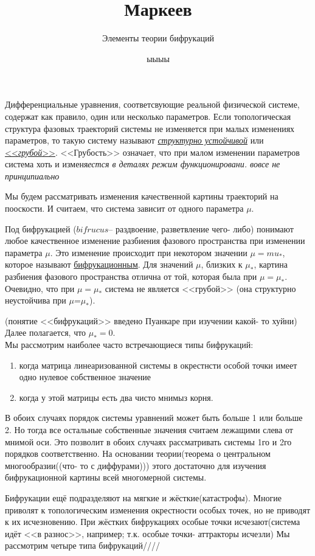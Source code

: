 \documentclass[a4paper,12pt]{article}
\author{Элементы теории бифрукаций}
\title{Маркеев}
\date{ыыыы}
\theoremstyle{plain} %
\theoremstyle{definition} %
\theoremstyle{remark} %
\begin{document}
Дифференциальные уравнения, соответсвующие реальной физической системе, содержат как правило, один или несколько параметров. Если топологическая структура фазовых траекторий системы не изменяется при малых изменениях параметров, то такую систему называют \underline{\textit{структурно устойчивой}} или \underline{<<\textit{грубой}>>}. <<Грубость>> означает, что при малом изменении параметров система хоть и изменя\textsl{естся в деталях режим функционировани. вовсе не принципиально}

Мы будем рассматривать изменения качественной картины траекторий на пооскости. И считаем, что система зависит от одного параметра $\mu$. 

Под бифрукацией ($bifrucus$-- раздвоение, разветвление чего- либо) понимают любое качественное изменение разбиения фазового пространства при изменении параметра $\mu$. Это изменение происходит при некотором значении $\mu=mu_*$, которое называют \underline{бифрукационным}.  Для значений $\mu$, близких к $\mu_*$, картина разбиения фазового пространства отлична от той, которая была при $\mu=\mu_*$. Очевидно, что при $\mu=\mu_*$ система не является <<грубой>> (она структурно неустойчива при $\mu$=$\mu_*$).

{\footnotesize (понятие <<бифрукаций>> введено Пуанкаре при изучении какой- то хуйни)}\\
Далее полагается, что $\mu_*=0$.\\
Мы рассмотрим наиболее часто встречающиеся типы бифрукаций:
\begin{enumerate}
\item когда матрица линеаризованной системы в окрестнсти особой точки имеет одно нулевое собственное значение
\item когда у этой матрицы есть два чисто мнимыз корня.
\end{enumerate}
В обоих случаях порядок системы уравнений может быть больше 1 или больше 2. Но тогда все остальные собственные значения считаем лежащими слева от мнимой оси. Это позволит в обоих случаях рассматривать системы 1го и 2го порядков соответственно. На основании теории(теорема о центральном многообразии((что- то с диффурами))) этого достаточно для изучения бифрукационной картины всей многомерной системы.

Бифрукации ещё подразделяют на мягкие и жёсткие(катастрофы). Многие приволят к топологическим изменения окрестности особых точек, но не приводят к их исчезновению. При жёстких бифрукациях особые точки исчезают(система идёт <<в разнос>>, например; т.к. особые точки- аттракторы исчезли)
Мы рассмотрим четыре типа бифрукаций////
\end{document}
